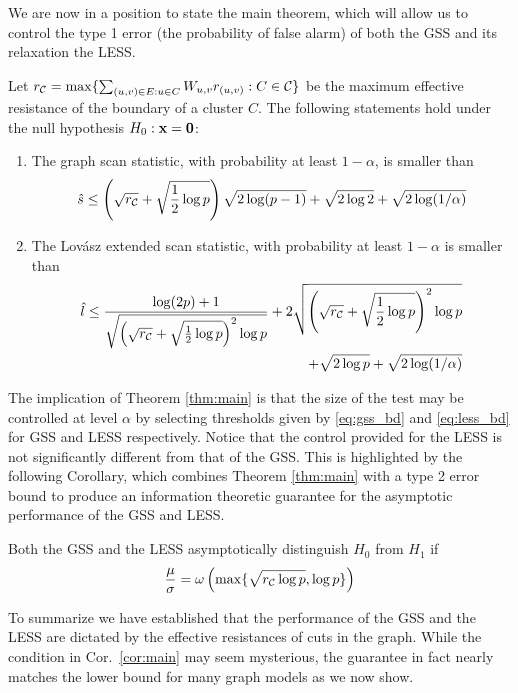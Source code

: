 We are now in a position to state the main theorem, which will allow us to control the type 1 error (the probability of false alarm) of both the GSS and its relaxation the LESS.
\begin{theorem}
\label{thm:main}
Let $r_{\mathcal{C}} = \max \{ \sum_{(u,v) \in E : u \in C} W_{u,v} r_{(u,v)} : C \in \mathcal{C} \}$ be the maximum effective resistance of the boundary of a cluster $C$.
The following statements hold under the null hypothesis $H_0: \mathbf{x} = {\bf 0}$:
\begin{enumerate}
\item The graph scan statistic, with probability at least $1 - \alpha$, is smaller than 
\begin{equation}
\label{eq:gss_bd}
\hat s \le \left(\sqrt{r_{\mathcal{C}}} + \sqrt{\frac{1}{2} \log p}\right)\sqrt{2 \log (p-1)} + \sqrt{2 \log 2} + \sqrt{2 \log (1 / \alpha)}
\end{equation}

\item The Lov\'asz extended scan statistic, with probability at least $1 - \alpha$ is smaller than
\begin{equation}
\label{eq:less_bd}
\begin{aligned}
\hat l \le \frac{\log (2p) + 1}{\sqrt{ \left(\sqrt{r_{\mathcal{C}}} + \sqrt{\frac 12 \log p} \right)^2 \log p} } + 2 \sqrt{\left(\sqrt{r_{\mathcal{C}}} + \sqrt{\frac 12 \log p} \right)^2 \log p} \\
+ \sqrt{2 \log p} + \sqrt{2 \log (1 / \alpha)}
\end{aligned}
\end{equation}
\end{enumerate}
\end{theorem}

The implication of Theorem \ref{thm:main} is that the size of the test may be controlled at level $\alpha$ by selecting thresholds given by \eqref{eq:gss_bd} and \eqref{eq:less_bd} for GSS and LESS respectively.
Notice that the control provided for the LESS is not significantly different from that of the GSS.
This is highlighted by the following Corollary, which combines Theorem \ref{thm:main} with a type 2 error bound to produce an information theoretic guarantee for the asymptotic performance of the GSS and LESS.

\begin{corollary}
\label{cor:main}
Both the GSS and the LESS asymptotically distinguish $H_0$ from $H_1$ if
\[
\frac{\mu}{\sigma} = \omega \left( \max\{ \sqrt{r_{\mathcal{C}} \log p}, \log p\} \right)
\]
\end{corollary}

To summarize we have established that the performance of the GSS and the LESS are dictated by the effective resistances of cuts in the graph.
While the condition in Cor.~\ref{cor:main} may seem mysterious, the guarantee in fact nearly matches the lower bound for many graph models as we now show.


